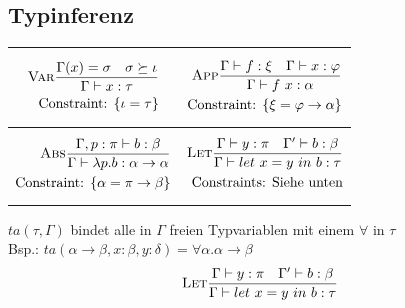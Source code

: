 \documentclass{Zusammenfassung}
\newcommand{\typeRule}[3]{ \textrm{\textsc{#1}}\frac{#2}{#3}}
\newcommand{\mylet}[3]{let\ #1=#2\ in\ #3}
\begin{document}
\subsection{Typinferenz}\label{subsec:typinferenz}
    \begin{table}[H]
        \centering
        \begin{tabularx}{\textwidth}{X|X}
            \begin{equation*}\begin{aligned}\typeRule{Var}{\Gamma(x)=\sigma\quad\sigma\succeq\iota}{\Gamma\vdash{}x:\tau} \\ \text{Constraint: }\{\iota=\tau\}\end{aligned}\end{equation*}&\begin{equation*}\begin{aligned}\typeRule{App}{\Gamma\vdash{}f:\xi\quad\Gamma\vdash{}x:\varphi}{\Gamma\vdash{}f\ x:\alpha}\\ \text{Constraint: }\{\xi=\varphi\rightarrow\alpha\}\end{aligned}\end{equation*}\\
            \hline
            \begin{equation*}\begin{aligned}\typeRule{Abs}{\Gamma,p:\pi\vdash{}b:\beta}{\Gamma\vdash\lambda{}p.b:\alpha\rightarrow\alpha}\\ \text{Constraint: }\{\alpha=\pi\rightarrow\beta\}\end{aligned}\end{equation*}&\begin{equation*}\begin{aligned}\typeRule{Let}{\Gamma\vdash{}y:\pi\quad\Gamma'\vdash{}b:\beta}{\Gamma\vdash\mylet{x}{y}{b:\tau}}\\ \text{Constraints: Siehe unten}\end{aligned}\end{equation*}\\
        \end{tabularx}\label{tab:table7}
    \end{table}
    $ta(\tau,\Gamma)$ bindet alle in $\Gamma$ freien Typvariablen mit einem $\forall$ in $\tau$\\
    Bsp.: $ta(\alpha\rightarrow\beta,x:\beta,y:\delta)=\forall\alpha.\alpha\rightarrow\beta$
    \begin{equation*}
        \typeRule{Let}{\Gamma\vdash{}y:\pi\quad\Gamma'\vdash{}b:\beta}{\Gamma\vdash\mylet{x}{y}{b:\tau}}
    \end{equation*}
\end{document}

